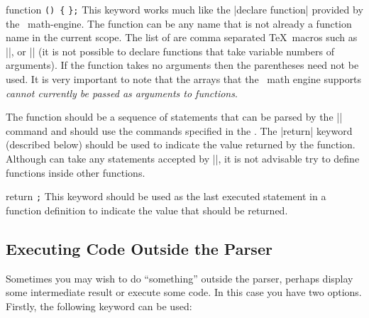 \begin{math-keyword}{{function} \texttt{(}\texttt{) \{}  \texttt{\};}}
    This keyword works much like the |declare function| provided by the
    \pgfname\ math-engine. The function  can be any name that is not
    already a function name in the current scope. The list of 
    are comma separated \TeX\ macros such as |\x|, or |\y| (it is not possible
    to declare functions that take variable numbers of arguments). If the
    function takes no arguments then the parentheses need not be used. It is
    very important to note that the arrays that the \pgfname\ math engine
    supports \emph{cannot currently be passed as arguments to functions}.

    The function  should be a sequence of statements that can
    be parsed by the |\tikzmath| command and should use the commands specified
    in the . The |return| keyword (described below) should be
    used to indicate the value returned by the function.
    Although  can take any statements accepted by |\tikzmath|,
    it is not advisable try to define functions inside other functions.
\begin{codeexample}[pre={\pgfmathsetseed{1}\begin{lateximage}},preamble={\usetikzlibrary{math}},post={\end{lateximage}}]
\end{codeexample}
\end{math-keyword}

\begin{math-keyword}{{return} \texttt{;}}
    This keyword should be used as the last executed statement in a function
    definition to indicate the value that should be returned.
\end{math-keyword}


\subsection{Executing Code Outside the Parser}

Sometimes you may wish to do ``something'' outside the parser, perhaps display
some intermediate result or execute some code. In this case you have two
options. Firstly, the following keyword can be used:

